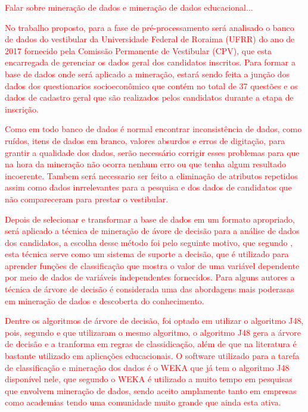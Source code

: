 \label{chapter:metodo}

\par
\textcolor{red}{Falar sobre mineração de dados e mineração de dados educacional...}

\par
\textcolor{red}{No trabalho proposto, para a fase de pré-processamento será analisado o banco de dados do vestibular da Universidade Federal de Roraima (UFRR) do ano de 2017 fornecido pela Comissão Permanente de Vestibular (CPV), que esta encarregada de gerenciar os dados geral dos candidatos inscritos. Para formar a base de dados onde será aplicado a mineração, estará sendo feita a junção dos dados dos questionarios socioeconômico que contém no total de 37 questões e os dados de cadastro geral que são realizados pelos candidatos durante a etapa de inscrição.}


\par
\textcolor{red}{Como em todo banco de dados é normal encontrar inconsistência de dados, como ruídos, itens de dados em branco, valores absurdos e erros de digitação, para grantir a qualidade dos dados, serão necessário corrigir esses problemas para que na hora da mineração não ocorra nenhum erro ou que tenha algum resultado incoerente. Tambem será necessario ser feito a eliminação de atributos repetidos assim como dados inrrelevantes para a pesquisa e dos dados de candidatos que não compareceram para prestar o vestibular.}

\par
\textcolor{red}{Depois de selecionar e transformar a base de dados em um formato apropriado, será aplicado a técnica de mineração de ávore de decisão para a análise de dados dos candidatos, a escolha desse método foi pelo seguinte motivo, que segundo , esta técnica serve como um sistema de suporte a decisão, que é utilizado para aprender funções de classificação que mostra o valor de uma variável dependente por meio de dados de variáveis independentes fornecidos. Para alguns autores a técnica de árvore de decisão é considerada uma das abordagens mais poderasas em mineração de dados e descoberta do conhecimento.}

\par
\textcolor{red}{Dentre os algoritmos de árvore de decisão, foi optado em utilizar o algoritmo J48, pois, segundo  e  que utilizaram o mesmo algoritmo, o algoritmo J48 gera a árvore de decisão e a tranforma em regras de classidicação, além de que na literatura é bastante utilizado em aplicações educacionais. O software utilizado para a tarefa de classificação e mineração dos dados é o WEKA que já tem o algoritmo J48 disponível nele, que segundo  o WEKA é utilizado a muito tempo em pesquisas que envolvem mineração de dados, sendo aceito amplamente tanto em empresas como academias tendo uma comunidade muito grande que ainda esta ativa.}

